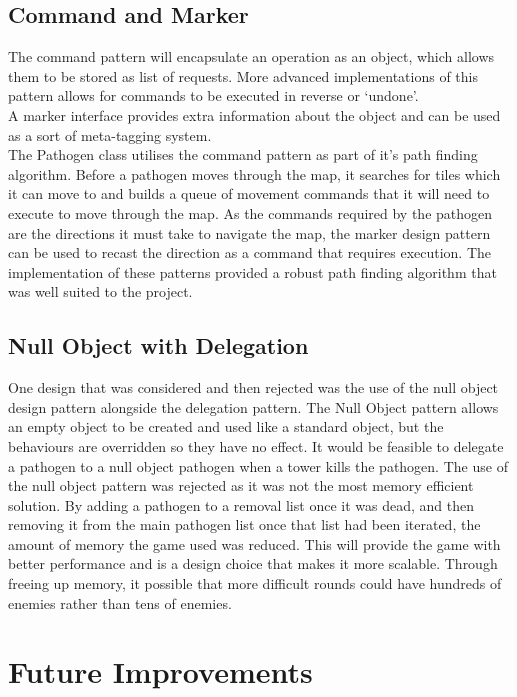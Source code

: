 \documentclass[a4paper,12pt]{article}
\begin{document}
\subsection*{Command and Marker}
The command pattern will encapsulate an operation as an object, which allows them to be stored as list of requests. More advanced implementations of this pattern allows for commands to be executed in reverse or `undone'. \cite{GoF-Book}
\\
A marker interface provides extra information about the object \cite{Lectures} and can be used as a sort of meta-tagging system. 
\\
The Pathogen class utilises the command pattern as part of it's path finding algorithm. Before a pathogen moves through the map, it searches for tiles which it can move to and builds a queue of movement commands that it will need to execute to move through the map. As the commands required by the pathogen are the directions it must take to navigate the map, the marker design pattern can be used to recast the direction as a command that requires execution. The implementation of these patterns provided a robust path finding algorithm that was well suited to the project.

\subsection*{Null Object with Delegation}
One design that was considered and then rejected was the use of the null object design pattern alongside the delegation pattern. The Null Object pattern allows an empty object to be created and used like a standard object, but the behaviours are overridden so they have no effect\cite{Lectures}. It would be feasible to delegate a pathogen to a null object pathogen when a tower kills the pathogen. The use of the null object pattern was rejected as it was not the most memory efficient solution. By adding a pathogen to a removal list once it was dead, and then removing it from the main pathogen list once that list had been iterated, the amount of memory the game used was reduced. This will provide the game with better performance and is a design choice that makes it more scalable. Through freeing up memory, it possible that more difficult rounds could have hundreds of enemies rather than tens of enemies. 

\section*{Future Improvements}
\end{document}
